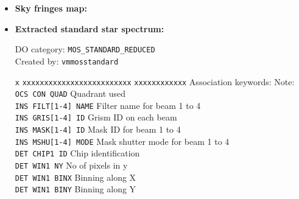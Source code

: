 \begin{itemize}
\item {\bf Sky fringes map:}


\item {\bf Extracted standard star spectrum:}

DO category: {\tt MOS\_STANDARD\_REDUCED} \\
Created by: {\tt vmmosstandard}

\begin{tabbing}
{\tt x} \= {\tt xxxxxxxxxxxxxxxxxxxxxxxxx} \= {\tt xxxxxxxxxxxx} \kill
\> Association keywords: \> Note: \\
\> {\tt OCS CON QUAD} \> Quadrant used \\
\> {\tt INS FILT[1-4] NAME} \> Filter name for beam 1 to 4 \\
\> {\tt INS GRIS[1-4] ID} \> Grism ID on each beam \\
\> {\tt INS MASK[1-4] ID} \> Mask ID for beam 1 to 4\\
\> {\tt INS MSHU[1-4] MODE} \> Mask shutter mode for beam 1 to 4\\
\> {\tt DET CHIP1 ID} \> Chip identification \\
\> {\tt DET WIN1 NY} \> No of pixels in y \\
\> {\tt DET WIN1 BINX} \> Binning along X \\
\> {\tt DET WIN1 BINY} \> Binning along Y \\
\end{tabbing}


\end{itemize}
